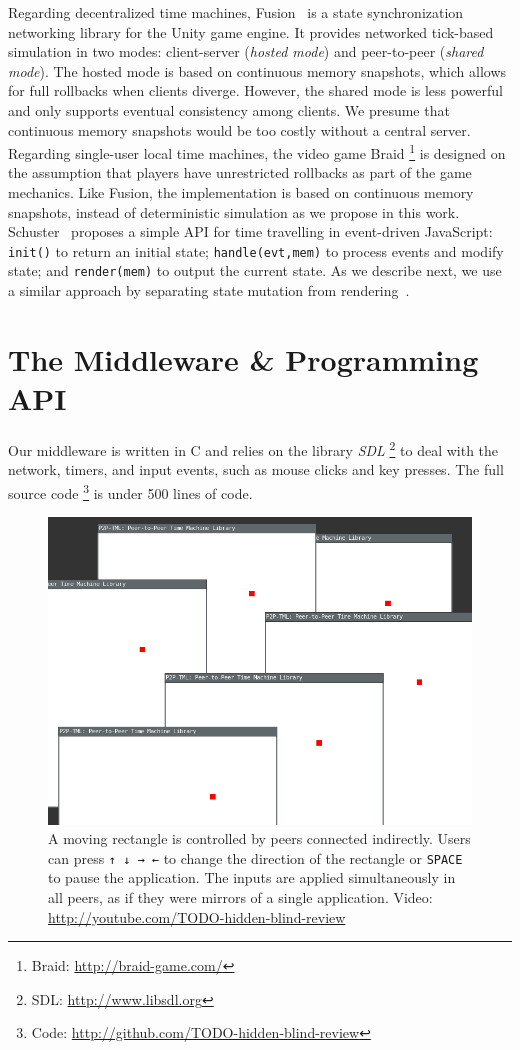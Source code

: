 \documentclass[12pt]{article}
\newcommand{\code}[1]  {\texttt{\small{#1}}}
\begin{document}
Regarding decentralized time machines, Fusion~\cite{fusion} is a state
synchronization networking library for the Unity game engine.
It provides networked tick-based simulation in two modes: client-server
(\emph{hosted mode}) and peer-to-peer (\emph{shared mode}).
The hosted mode is based on continuous memory snapshots, which allows for
full rollbacks when clients diverge.
However, the shared mode is less powerful and only supports eventual
consistency among clients.
We presume that continuous memory snapshots would be too costly without a
central server.
%
Regarding single-user local time machines, the video game Braid%
\footnote{Braid: \url{http://braid-game.com/}}
is designed on the assumption that players have unrestricted rollbacks as part
of the game mechanics.
Like Fusion, the implementation is based on continuous memory snapshots,
instead of deterministic simulation as we propose in this work.
%
Schuster~\cite{tml.js} proposes a simple API for time travelling in
event-driven JavaScript:
    \code{init()} to return an initial state;
    \code{handle(evt,mem)} to process events and modify state; and
    \code{render(mem)} to output the current state.
As we describe next, we use a similar approach by separating state mutation
from rendering~\cite{tml.alive}.

\section{The Middleware \& Programming API}
\label{sec.tml}

Our middleware is written in C and relies on the library \emph{SDL}%
\footnote{SDL: \url{http://www.libsdl.org}}
to deal with the network, timers, and input events, such as mouse clicks and
key presses.
The full source code%
\footnote{Code: \url{http://github.com/TODO-hidden-blind-review}}
is under 500 lines of code.

\begin{figure}
    \centering
    \includegraphics[width=0.5\linewidth]{move}
    \caption[XXX] {
        A moving rectangle is controlled by peers connected indirectly.
        Users can press \code{↑ ↓ → ←} to change the direction of the
        rectangle or \code{SPACE} to pause the application.
        The inputs are applied simultaneously in all peers, as if they were
        mirrors of a single application.
        Video: \url{http://youtube.com/TODO-hidden-blind-review}
        \label{fig.move}
    }
\end{figure}
\end{document}
